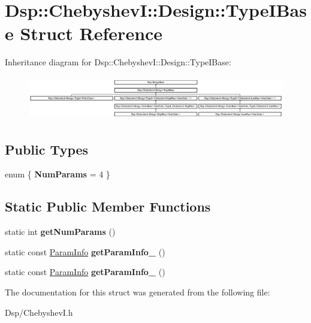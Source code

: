 \hypertarget{structDsp_1_1ChebyshevI_1_1Design_1_1TypeIBase}{\section{Dsp\-:\-:Chebyshev\-I\-:\-:Design\-:\-:Type\-I\-Base Struct Reference}
\label{structDsp_1_1ChebyshevI_1_1Design_1_1TypeIBase}
}
Inheritance diagram for Dsp\-:\-:Chebyshev\-I\-:\-:Design\-:\-:Type\-I\-Base\-:\begin{figure}[H]
\begin{center}
\leavevmode
\includegraphics[height=1.924399cm]{structDsp_1_1ChebyshevI_1_1Design_1_1TypeIBase}
\end{center}
\end{figure}
\subsection*{Public Types}
\begin{DoxyCompactItemize}
\item 
enum \{ {\bfseries Num\-Params} =  4
 \}
\end{DoxyCompactItemize}
\subsection*{Static Public Member Functions}
\begin{DoxyCompactItemize}
\item 
\hypertarget{structDsp_1_1ChebyshevI_1_1Design_1_1TypeIBase_a8ab40838adbad6dd4c1a5125afd4a437}{static int {\bfseries get\-Num\-Params} ()}\label{structDsp_1_1ChebyshevI_1_1Design_1_1TypeIBase_a8ab40838adbad6dd4c1a5125afd4a437}

\item 
\hypertarget{structDsp_1_1ChebyshevI_1_1Design_1_1TypeIBase_ae290a4b137e844135e893749d946270a}{static const \hyperlink{classDsp_1_1ParamInfo}{Param\-Info} {\bfseries get\-Param\-Info\-\_} ()}\label{structDsp_1_1ChebyshevI_1_1Design_1_1TypeIBase_ae290a4b137e844135e893749d946270a}

\item 
\hypertarget{structDsp_1_1ChebyshevI_1_1Design_1_1TypeIBase_ac83f8c754d661041534154ce832e3548}{static const \hyperlink{classDsp_1_1ParamInfo}{Param\-Info} {\bfseries get\-Param\-Info\-\_} ()}\label{structDsp_1_1ChebyshevI_1_1Design_1_1TypeIBase_ac83f8c754d661041534154ce832e3548}

\end{DoxyCompactItemize}


The documentation for this struct was generated from the following file\-:\begin{DoxyCompactItemize}
\item 
Dsp/Chebyshev\-I.\-h\end{DoxyCompactItemize}
